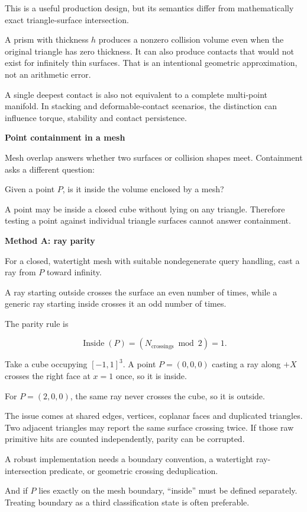 This is a useful production design, but its semantics differ from mathematically exact triangle-surface intersection.

A prism with thickness \(h\) produces a nonzero collision volume even when the original triangle has zero thickness. It can also produce contacts that would not exist for infinitely thin surfaces. That is an intentional geometric approximation, not an arithmetic error.

A single deepest contact is also not equivalent to a complete multi-point manifold. In stacking and deformable-contact scenarios, the distinction can influence torque, stability and contact persistence.

\textbf{Point containment in a mesh}

Mesh overlap answers whether two surfaces or collision shapes meet. Containment asks a different question:

Given a point \(P\), is it inside the volume enclosed by a mesh?

A point may be inside a closed cube without lying on any triangle. Therefore testing a point against individual triangle surfaces cannot answer containment.

\textbf{Method A: ray parity}

For a closed, watertight mesh with suitable nondegenerate query handling, cast a ray from \(P\) toward infinity.

A ray starting outside crosses the surface an even number of times, while a generic ray starting inside crosses it an odd number of times.

The parity rule is

\[
\operatorname{Inside}(P)=(N_{\text{crossings}}\bmod2)=1.
\]

Take a cube occupying \([-1,1]^3\). A point \(P=(0,0,0)\) casting a ray along \(+X\) crosses the right face at \(x=1\) once, so it is inside.

For \(P=(2,0,0)\), the same ray never crosses the cube, so it is outside.

The issue comes at shared edges, vertices, coplanar faces and duplicated triangles. Two adjacent triangles may report the same surface crossing twice. If those raw primitive hits are counted independently, parity can be corrupted.

A robust implementation needs a boundary convention, a watertight ray-intersection predicate, or geometric crossing deduplication.

And if \(P\) lies exactly on the mesh boundary, ``inside'' must be defined separately. Treating boundary as a third classification state is often preferable.

